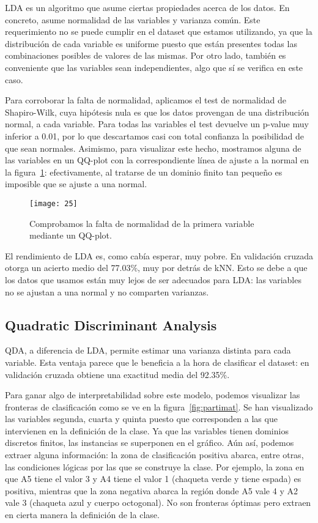 \documentclass[a4paper, 11pt]{article}
\begin{document}
LDA es un algoritmo que asume ciertas propiedades acerca de los datos. En concreto, asume normalidad de las variables y varianza común. Este requerimiento no se puede cumplir en el dataset que estamos utilizando, ya que la distribución de cada variable es uniforme puesto que están presentes todas las combinaciones posibles de valores de las mismas. Por otro lado, también es conveniente que las variables sean independientes, algo que sí se verifica en este caso.

Para corroborar la falta de normalidad, aplicamos el test de normalidad de Shapiro-Wilk, cuya hipótesis nula es que los datos provengan de una distribución normal, a cada variable. Para todas las variables el test devuelve un p-value muy inferior a 0.01, por lo que descartamos casi con total confianza la posibilidad de que sean normales. Asimismo, para visualizar este hecho, mostramos alguna de las variables en un QQ-plot con la correspondiente línea de ajuste a la normal en la figura~\ref{fig:qqfail}: efectivamente, al tratarse de un dominio finito tan pequeño es imposible que se ajuste a una normal.

\begin{figure}[ht]
  \texttt{[image: 25]}
  \caption{\label{fig:qqfail}Comprobamos la falta de normalidad de la primera variable mediante un QQ-plot.}
\end{figure}

El rendimiento de LDA es, como cabía esperar, muy pobre. En validación cruzada otorga un acierto medio del 77.03\%, muy por detrás de kNN. Esto se debe a que los datos que usamos están muy lejos de ser adecuados para LDA: las variables no se ajustan a una normal y no comparten varianzas.

\subsection{Quadratic Discriminant Analysis}

QDA, a diferencia de LDA, permite estimar una varianza distinta para cada variable. Esta ventaja parece que le beneficia a la hora de clasificar el dataset: en validación cruzada obtiene una exactitud media del 92.35\%.

Para ganar algo de interpretabilidad sobre este modelo, podemos visualizar las fronteras de clasificación como se ve en la figura~\ref{fig:partimat}. Se han visualizado las variables segunda, cuarta y quinta puesto que corresponden a las que intervienen en la definición de la clase. Ya que las variables tienen dominios discretos finitos, las instancias se superponen en el gráfico. Aún así, podemos extraer alguna información: la zona de clasificación positiva abarca, entre otras, las condiciones lógicas por las que se construye la clase. Por ejemplo, la zona en que A5 tiene el valor 3 y A4 tiene el valor 1 (chaqueta verde y tiene espada) es positiva, mientras que la zona negativa abarca la región donde A5 vale 4 y A2 vale 3 (chaqueta azul y cuerpo octogonal). No son fronteras óptimas pero extraen en cierta manera la definición de la clase.
\end{document}
